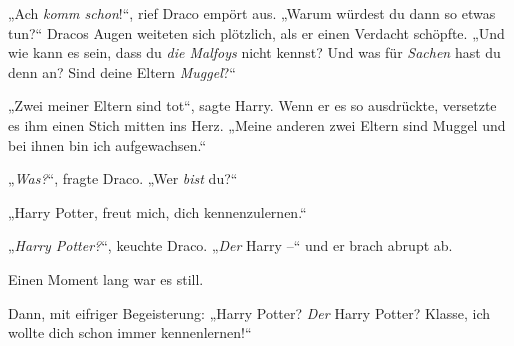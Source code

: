 „Ach \emph{komm schon}!“, rief Draco empört aus. „Warum würdest du dann so etwas tun?“ Dracos Augen weiteten sich plötzlich, als er einen Verdacht schöpfte. „Und wie kann es sein, dass du \emph{die Malfoys} nicht kennst? Und was für \emph{Sachen} hast du denn an? Sind deine Eltern \emph{Muggel}?“

„Zwei meiner Eltern sind tot“, sagte Harry. Wenn er es so ausdrückte, versetzte es ihm einen Stich mitten ins Herz. „Meine anderen zwei Eltern sind Muggel und bei ihnen bin ich aufgewachsen.“

„\emph{Was?}“, fragte Draco. „Wer \emph{bist} du?“

„Harry Potter, freut mich, dich kennenzulernen.“

„\emph{Harry Potter?}“, keuchte Draco. „\emph{Der} Harry –“ und er brach abrupt ab.

Einen Moment lang war es still.

Dann, mit eifriger Begeisterung: „Harry Potter? \emph{Der} Harry Potter? Klasse, ich wollte dich schon immer kennenlernen!“

